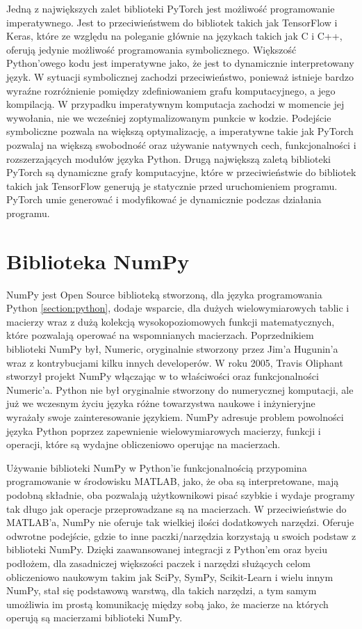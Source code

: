Jedną z największych zalet biblioteki PyTorch jest możliwość programowanie imperatywnego. Jest to przeciwieństwem do bibliotek takich jak TensorFlow i Keras, które ze względu na poleganie głównie na językach takich jak C i C++, oferują jedynie możliwość programowania symbolicznego. Większość Python'owego kodu jest imperatywne jako, że jest to dynamicznie interpretowany język. W sytuacji symbolicznej zachodzi przeciwieństwo, ponieważ istnieje bardzo wyraźne rozróżnienie pomiędzy zdefiniowaniem grafu komputacyjnego, a jego kompilacją. W przypadku imperatywnym komputacja zachodzi w momencie jej wywołania, nie we wcześniej zoptymalizowanym punkcie w kodzie. Podejście symboliczne pozwala na większą optymalizację, a imperatywne takie jak PyTorch pozwalaj na większą swobodność oraz używanie natywnych cech, funkcjonalności i rozszerzających modułów języka Python.
Drugą największą zaletą biblioteki PyTorch są dynamiczne grafy komputacyjne, które w przeciwieństwie do bibliotek takich jak TensorFlow generują je statycznie przed uruchomieniem programu. PyTorch umie generować i modyfikować je dynamicznie podczas działania programu.

\clearpage

\section{Biblioteka NumPy}
\label{section:numpy}
NumPy \cite{PythonForDataAnalysis} \cite{SciPyAndNumPy} \cite{NumPyManual} \cite{WikipediaNumPy} jest Open Source biblioteką stworzoną, dla języka programowania Python \ref{section:python}, dodaje wsparcie, dla dużych wielowymiarowych tablic i macierzy wraz z dużą kolekcją wysokopoziomowych funkcji matematycznych, które pozwalają operować na wspomnianych macierzach. Poprzednikiem biblioteki NumPy był, Numeric, oryginalnie stworzony przez Jim'a Hugunin'a wraz z kontrybucjami kilku innych developerów. W roku 2005, Travis Oliphant stworzył projekt NumPy włączając w to właściwości oraz funkcjonalności Numeric'a.
Python nie był oryginalnie stworzony do numerycznej komputacji, ale już we wczesnym życiu języka różne towarzystwa naukowe i inżynieryjne wyrażały swoje zainteresowanie językiem.
NumPy adresuje problem powolności języka Python poprzez zapewnienie wielowymiarowych macierzy, funkcji i operacji, które są wydajne obliczeniowo operując na macierzach.

Używanie biblioteki NumPy w Python'ie funkcjonalnością przypomina programowanie w środowisku MATLAB, jako, że oba są interpretowane, mają podobną składnie, oba pozwalają użytkownikowi pisać szybkie i wydaje programy tak długo jak operacje przeprowadzane są na macierzach. W przeciwieństwie do MATLAB'a, NumPy nie oferuje tak wielkiej ilości dodatkowych narzędzi. Oferuje odwrotne podejście, gdzie to inne paczki/narzędzia korzystają u swoich podstaw z biblioteki NumPy. Dzięki zaawansowanej integracji z Python'em oraz byciu podłożem, dla zasadniczej większości paczek i narzędzi służących celom obliczeniowo naukowym takim jak SciPy, SymPy, Scikit-Learn i wielu innym NumPy, stał się podstawową warstwą, dla takich narzędzi, a tym samym umożliwia im prostą komunikację między sobą jako, że macierze na których operują są macierzami biblioteki NumPy.

